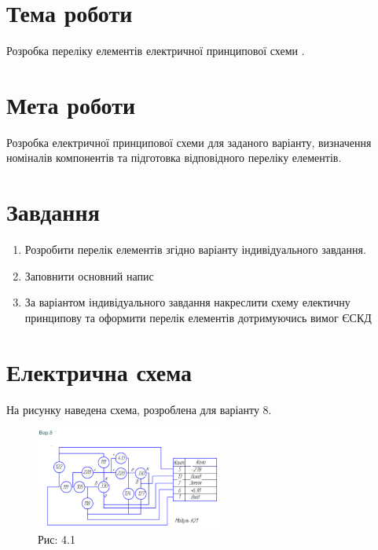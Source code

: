 \documentclass[a4paper]{article}
\begin{document}
\section*{Тема роботи}
Розробка
переліку елементів електричної принципової схеми .

\section*{Мета роботи}
Розробка електричної принципової схеми для заданого варіанту, визначення номіналів компонентів та підготовка відповідного переліку елементів.

\section*{Завдання}

\begin{enumerate}
    \item Розробити перелік елементів згідно варіанту індивідуального завдання.
    \item Заповнити основний напис
    \item За варіантом індивідуального завдання накреслити схему електичну принципову та оформити перелік елементів дотримуючись вимог ЄСКД
\end{enumerate}

\section*{Електрична схема}
На рисунку наведена схема, розроблена для варіанту 8.

\begin{figure}[h]
    \centering
    \includegraphics[width=0.55\textwidth]{imgs/PW4.0.png}
    \caption*{Рис: 4.1}
\end{figure}
\end{document}

